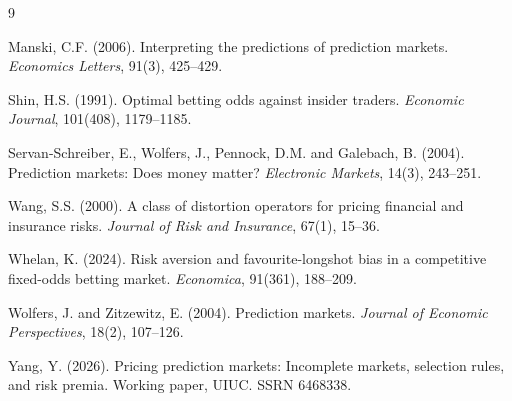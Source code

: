 \documentclass[12pt]{article}
\begin{document}
\footnotesize
\begin{thebibliography}{9}

 Manski, C.F. (2006). Interpreting the predictions of prediction markets. \textit{Economics Letters}, 91(3), 425--429.

 Shin, H.S. (1991). Optimal betting odds against insider traders. \textit{Economic Journal}, 101(408), 1179--1185.

 Servan-Schreiber, E., Wolfers, J., Pennock, D.M. and Galebach, B. (2004). Prediction markets: Does money matter? \textit{Electronic Markets}, 14(3), 243--251.

 Wang, S.S. (2000). A class of distortion operators for pricing financial and insurance risks. \textit{Journal of Risk and Insurance}, 67(1), 15--36.

 Whelan, K. (2024). Risk aversion and favourite-longshot bias in a competitive fixed-odds betting market. \textit{Economica}, 91(361), 188--209.

 Wolfers, J. and Zitzewitz, E. (2004). Prediction markets. \textit{Journal of Economic Perspectives}, 18(2), 107--126.

 Yang, Y. (2026). Pricing prediction markets: Incomplete markets, selection rules, and risk premia. Working paper, UIUC. SSRN 6468338.

\end{thebibliography}
\end{document}
